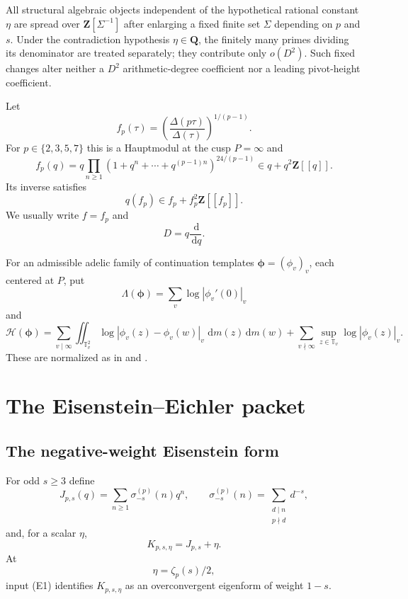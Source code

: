 \documentclass[11pt]{article}
\theoremstyle{definition}
\theoremstyle{remark}
\newcommand{\Q}{\mathbf Q}
\newcommand{\Z}{\mathbf Z}
\newcommand{\dd}{\,\mathrm d}
\newcommand{\Energy}{\mathscr H}
\newcommand{\LambdaAH}{\Lambda}
\newcommand{\abs}[1]{\left|#1\right|}
\newcommand{\T}{\mathbb T}
\begin{document}
All structural algebraic objects independent of the hypothetical rational
constant $\eta$ are spread over $\Z[\Sigma^{-1}]$ after enlarging a fixed
finite set $\Sigma$ depending on $p$ and $s$.  Under the contradiction
hypothesis $\eta\in\Q$, the finitely many primes dividing its denominator
are treated separately; they contribute only $o(D^2)$.  Such fixed changes
alter neither a $D^2$ arithmetic-degree coefficient nor a leading pivot-height
coefficient.

Let
\[
 f_p(\tau)=
 \left(\frac{\Delta(p\tau)}{\Delta(\tau)}\right)^{1/(p-1)}.
\]
For $p\in\{2,3,5,7\}$ this is a Hauptmodul at the cusp $P=\infty$ and
\begin{equation}\label{eq:f-product}
 f_p(q)=q\prod_{n\ge1}
 \left(1+q^n+\cdots+q^{(p-1)n}\right)^{24/(p-1)}
 \in q+q^2\Z[[q]].
\end{equation}
Its inverse satisfies
\begin{equation}\label{eq:q-inverse}
 q(f_p)\in f_p+f_p^2\Z[[f_p]].
\end{equation}
We usually write $f=f_p$ and
\[
 D=q\frac{\dd}{\dd q}.
\]

For an admissible adelic family of continuation templates
$\boldsymbol\phi=(\phi_v)_v$, each centered at $P$, put
\[
 \LambdaAH(\boldsymbol\phi)=
 \sum_v\log\abs{\phi_v'(0)}_v
\]
and
\[
 \Energy(\boldsymbol\phi)=
 \sum_{v\mid\infty}
 \iint_{\T_v^2}\log\abs{\phi_v(z)-\phi_v(w)}_v\,\dd m(z)\dd m(w)
 +\sum_{v\nmid\infty}
 \sup_{z\in\T_v}\log\abs{\phi_v(z)}_v.
\]
These are normalized as in \cite[Section~7.3]{CDT2024} and
\cite[Section~2]{CDT2025}.

\section{The Eisenstein--Eichler packet}\label{sec:packet}

\subsection{The negative-weight Eisenstein form}

For odd $s\ge3$ define
\begin{equation}\label{eq:J-def}
 J_{p,s}(q)=\sum_{n\ge1}\sigma_{-s}^{(p)}(n)q^n,
 \qquad
 \sigma_{-s}^{(p)}(n)=
 \sum_{\substack{d\mid n\\p\nmid d}}d^{-s},
\end{equation}
and, for a scalar $\eta$,
\[
 K_{p,s,\eta}=J_{p,s}+\eta.
\]
At
\[
 \eta=\zeta_p(s)/2,
\]
input (E1) identifies $K_{p,s,\eta}$ as an overconvergent eigenform of
weight $1-s$.
\end{document}
